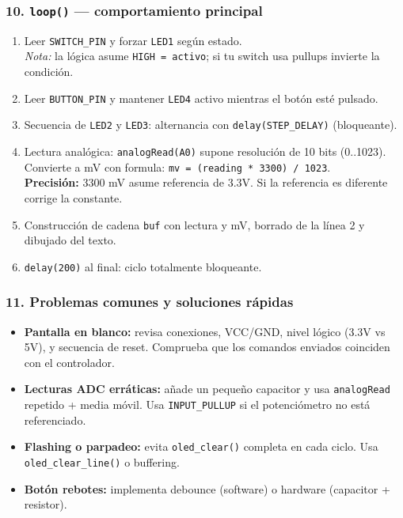 \documentclass[a4paper,12pt]{article}
\begin{document}
\subsubsection*{10. \texttt{loop()} — comportamiento principal}
\begin{enumerate}
  \item Leer \texttt{SWITCH\_PIN} y forzar \texttt{LED1} según estado. \\
    \textit{Nota:} la lógica asume \texttt{HIGH = activo}; si tu switch usa pullups invierte la condición.
  \item Leer \texttt{BUTTON\_PIN} y mantener \texttt{LED4} activo mientras el botón esté pulsado.
  \item Secuencia de \texttt{LED2} y \texttt{LED3}: alternancia con \texttt{delay(STEP\_DELAY)} (bloqueante).
  \item Lectura analógica: \texttt{analogRead(A0)} supone resolución de 10 bits (0..1023). Convierte a mV con formula: \texttt{mv = (reading * 3300) / 1023}. \\
    \textbf{Precisión:} 3300 mV asume referencia de 3.3V. Si la referencia es diferente corrige la constante.
  \item Construcción de cadena \texttt{buf} con lectura y mV, borrado de la línea 2 y dibujado del texto.
  \item \texttt{delay(200)} al final: ciclo totalmente bloqueante.
\end{enumerate}

\subsubsection*{11. Problemas comunes y soluciones rápidas}
\begin{itemize}
  \item \textbf{Pantalla en blanco:} revisa conexiones, VCC/GND, nivel lógico (3.3V vs 5V), y secuencia de reset. Comprueba que los comandos enviados coinciden con el controlador.
  \item \textbf{Lecturas ADC erráticas:} añade un pequeño capacitor y usa \texttt{analogRead} repetido + media móvil. Usa \texttt{INPUT\_PULLUP} si el potenciómetro no está referenciado.
  \item \textbf{Flashing o parpadeo:} evita \texttt{oled\_clear()} completa en cada ciclo. Usa \texttt{oled\_clear\_line()} o buffering.
  \item \textbf{Botón rebotes:} implementa debounce (software) o hardware (capacitor + resistor).
\end{itemize}
\end{document}
